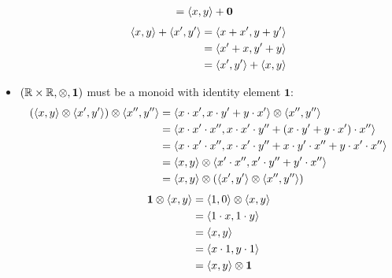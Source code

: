 \documentclass[a4paper,12pt]{ETHexercise}
\begin{document}
\begin{question}
\begin{subquestion}
\begin{itemize}
\begin{align}
                                       & = {\langle x , y \rangle} + \mathbf{0}
            \end{align}
            \begin{align}
              {\langle x , y \rangle} + {\langle x' , y' \rangle} & = {\langle x + x' , y + y' \rangle}       \\
                                          & = {\langle x' + x , y' + y \rangle}       \\
                                          & = {\langle x' , y' \rangle} + {\langle x , y \rangle}
            \end{align}
      \item $(\mathbb{R} \times \mathbb{R}, \otimes, \mathbf{1})$ must be a monoid with identity element $\mathbf{1}$:
            \begin{align}
              \left({\langle x , y \rangle} \otimes {\langle x' , y' \rangle} \right) \otimes {\langle x'' , y'' \rangle} & = {\langle x \cdot x' , x \cdot y' + y \cdot x' \rangle} \otimes {\langle x'' , y'' \rangle}                              \\
                                                                                      & = {\langle x \cdot x' \cdot x'' , x \cdot x' \cdot y'' + (x \cdot y' + y \cdot x') \cdot x'' \rangle}         \\
                                                                                      & = {\langle x \cdot x' \cdot x'' , x \cdot x' \cdot y'' + x \cdot y' \cdot x'' + y \cdot x' \cdot x'' \rangle} \\
                                                                                      & = {\langle x , y \rangle} \otimes {\langle x' \cdot x'' , x' \cdot y'' + y' \cdot x'' \rangle}                            \\
                                                                                      & = {\langle x , y \rangle} \otimes \left({\langle x' , y' \rangle} \otimes {\langle x'' , y'' \rangle}\right)
            \end{align}
            \begin{align}
              \mathbf{1} \otimes {\langle x , y \rangle} & = {\langle 1 , 0 \rangle} \otimes {\langle x , y \rangle} \\
                                             & = {\langle 1 \cdot x , 1 \cdot y \rangle}     \\
                                             & = {\langle x , y \rangle}                     \\
                                             & = {\langle x \cdot 1 , y \cdot 1 \rangle}     \\
                                             & = {\langle x , y \rangle} \otimes \mathbf{1}
            \end{align}

\end{itemize}
\end{subquestion}
\end{question}
\end{document}
